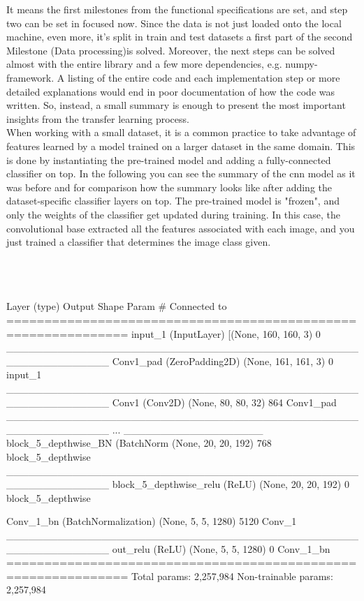 It means the first milestones from the functional specifications are set, and step two can be set in focused now. Since the data is not just loaded onto the local machine, even more, it's split in train and test datasets a first part of the second Milestone (Data processing)is solved. Moreover, the next steps can be solved almost with the entire library and a few more dependencies, e.g. numpy-framework. A listing of the entire code and each implementation step or more detailed explanations would end in poor documentation of how the code was written. So, instead, a small summary is enough to present the most important insights from the transfer learning process.\\

When working with a small dataset, it is a common practice to take advantage of features learned by a model trained on a larger dataset in the same domain. This is done by instantiating the pre-trained model and adding a fully-connected classifier on top. In the following you can see the summary of the \gls{cnn} model as it was before and for comparison how the summary looks like after adding the dataset-specific classifier layers on top. The pre-trained model is "frozen", and only the weights of the classifier get updated during training. In this case, the convolutional base extracted all the features associated with each image, and you just trained a classifier that determines the image class given. \\\\\\\\

\begin{python}[label={lst:cnn_summary_before}, caption={Model summary before adding layers for the prediction of probabilities}]
Layer (type)                    Output Shape         Param #     Connected to                     
==============================================================
input_1 (InputLayer)            [(None, 160, 160, 3) 0                                            
______________________________________________________________
Conv1_pad (ZeroPadding2D)       (None, 161, 161, 3)  0       input_1                   
______________________________________________________________
Conv1 (Conv2D)                  (None, 80, 80, 32)   864       Conv1_pad              
______________________________________________________________
...
___________________
block_5_depthwise_BN (BatchNorm (None, 20, 20, 192)  768    block_5_depthwise          
______________________________________________________________
block_5_depthwise_relu (ReLU)   (None, 20, 20, 192)  0        block_5_depthwise      

Conv_1_bn (BatchNormalization)  (None, 5, 5, 1280)   5120    Conv_1                    
______________________________________________________________
out_relu (ReLU)                 (None, 5, 5, 1280)   0          Conv_1_bn                  
==============================================================
Total params: 2,257,984
Non-trainable params: 2,257,984
\end{python}

